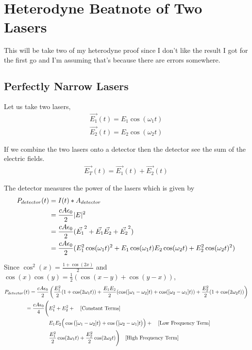 \chapter{Heterodyne Beatnote of Two Lasers}

This will be take two of my heterodyne proof since I don't like the result I got for the first go and I'm assuming that's because there are errors somewhere.

\section{Perfectly Narrow Lasers}
Let us take two lasers,
\begin{align}
\vec{E_1}(t) = E_1\cos(\omega_1 t)\\
\vec{E_2}(t) = E_2\cos(\omega_2 t)
\end{align}

If we combine the two lasers onto a detector then the detector see the sum of the electric fields.
\begin{align}
\vec{E_T}(t) = \vec{E_1}(t) + \vec{E_2}(t)
\end{align}

The detector measures the power of the lasers which is given by
\begin{align}
P_{detector}(t) &= I(t) * A_{detector}\notag\\
&= \frac{cA\epsilon_0}{2}|E|^2\notag\\
&= \frac{cA\epsilon_0}{2}(\vec{E_1}^2 + \vec{E_1}\vec{E_2} + \vec{E_2}^2)\notag\\
&= \frac{cA\epsilon_0}{2}(E_1^2\cos(\omega_1 t)^2 + E_1\cos(\omega_1 t)E_2\cos(\omega_2 t) + E_2^2\cos(\omega_2 t)^2)
\end{align}

Since $\cos^2(x) = \frac{1+\cos(2x)}{2}$ and $\cos(x)\cos(y) = \frac{1}{2}(\cos(x-y)+\cos(y-x))$,
\begin{align}
P_{detector}(t) = \frac{cA\epsilon_0}{2}&\left(\frac{E_1^2}{2}(1+\cos(2\omega_1 t)) + \frac{E_1E_2}{2}(\cos([\omega_1-\omega_2]t)+\cos([\omega_2-\omega_1] t)) + \frac{E_2^2}{2}(1+\cos(2\omega_2 t))\right)\notag\\
= \frac{cA\epsilon_0}{4}\Bigg(&E_1^2 + E_2^2+\quad\mathrm{[Constant\,\, Terms]}\notag\\
&E_1E_2\Big(\cos\big([\omega_1-\omega_2]t\big) + \cos\big([\omega_2-\omega_1] t\big)\Big) +\quad\mathrm{[Low\,\,Frequency\,\, Term]}\notag\\
&\frac{E_1^2}{2}\cos(2\omega_1t) + \frac{E_2^2}{2}\cos(2\omega_2t) \Bigg)\quad\mathrm{[High\,\, Frequency\,\, Term]}
\end{align}


